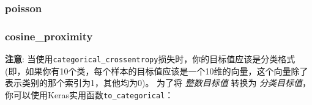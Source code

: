 \begin{Shaded}
\begin{Highlighting}[]
\end{Highlighting}
\end{Shaded}



\subsubsection{poisson}\label{poisson}

\begin{Shaded}
\begin{Highlighting}[]
\end{Highlighting}
\end{Shaded}



\subsubsection{cosine\_proximity}\label{cosineux5fproximity}

\begin{Shaded}
\begin{Highlighting}[]
\end{Highlighting}
\end{Shaded}



\textbf{注意}:
当使用\texttt{categorical\_crossentropy}损失时，你的目标值应该是分类格式
(即，如果你有10个类，每个样本的目标值应该是一个10维的向量，这个向量除了表示类别的那个索引为1，其他均为0)。
为了将 \emph{整数目标值} 转换为
\emph{分类目标值}，你可以使用Keras实用函数\texttt{to\_categorical}：

\begin{Shaded}
\begin{Highlighting}[]
  

\OperatorTok{=} \OperatorTok{=}\NormalTok{)}
\end{Highlighting}
\end{Shaded}
\newpage